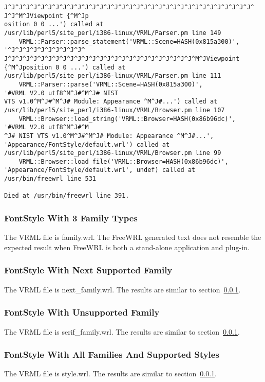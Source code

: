 \documentclass[12pt,letterpaper]{article}
\newcommand{\FSB}{FontStyle With 3 Family Types}
\newcommand{\FSC}{FontStyle With Next Supported Family}
\newcommand{\FSD}{FontStyle With Unsupported Family}
\newcommand{\FSE}{FontStyle With All Families And Supported Styles}
\begin{document}
\begin{verbatim}
J^J^J^J^J^J^J^J^J^J^J^J^J^J^J^J^J^J^J^J^J^J^J^J^J^J^J^J^J^J^J^J^J^J^
J^J^M^JViewpoint {^M^Jp
osition 0 0 ...') called at
/usr/lib/perl5/site_perl/i386-linux/VRML/Parser.pm line 149
    VRML::Parser::parse_statement('VRML::Scene=HASH(0x815a300)',
'^J^J^J^J^J^J^J^J^J^J^
J^J^J^J^J^J^J^J^J^J^J^J^J^J^J^J^J^J^J^J^J^J^J^J^J^J^M^JViewpoint
{^M^Jposition 0 0 ...') called at
/usr/lib/perl5/site_perl/i386-linux/VRML/Parser.pm line 111
    VRML::Parser::parse('VRML::Scene=HASH(0x815a300)',
'#VRML V2.0 utf8^M^J#^M^J# NIST 
VTS v1.0^M^J#^M^J# Module: Appearance ^M^J#...') called at
/usr/lib/perl5/site_perl/i386-linux/VRML/Browser.pm line 107
    VRML::Browser::load_string('VRML::Browser=HASH(0x86b96dc)',
'#VRML V2.0 utf8^M^J#^M
^J# NIST VTS v1.0^M^J#^M^J# Module: Appearance ^M^J#...',
'Appearance/FontStyle/default.wrl') called at
/usr/lib/perl5/site_perl/i386-linux/VRML/Browser.pm line 99
    VRML::Browser::load_file('VRML::Browser=HASH(0x86b96dc)',
'Appearance/FontStyle/default.wrl', undef) called at
/usr/bin/freewrl line 531

Died at /usr/bin/freewrl line 391.
\end{verbatim}

\subsubsection{\FSB}
\label{sec:3-families}
The VRML file is family.wrl.\newline
The FreeWRL generated text does not resemble the expected result when FreeWRL is both 
a stand-alone application and plug-in.

\subsubsection{\FSC}
The VRML file is next\_family.wrl.\newline
The results are similar to section~\ref{sec:3-families}.

\subsubsection{\FSD}
The VRML file is serif\_family.wrl.\newline
The results are similar to section~\ref{sec:3-families}.

\subsubsection{\FSE}
The VRML file is style.wrl.\newline
The results are similar to section~\ref{sec:3-families}.
\end{document}
